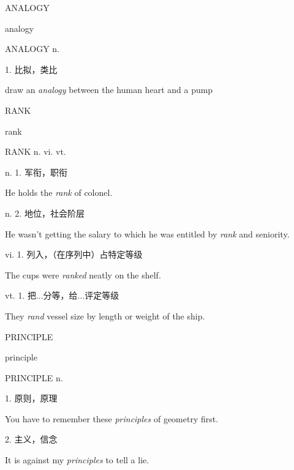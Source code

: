 \begin{flashcard}{
ANALOGY

analogy
}
\begin{center}
ANALOGY n. 
\end{center}
1. 比拟，类比

draw an \textit{analogy} between the human heart and a pump

\end{flashcard}
\begin{flashcard}{
RANK

rank
}
\begin{center}
RANK n. vi. vt. \textipa{[r\ae \ng k]}
\end{center}
n. 1. 军衔，职衔

He holds the \textit{rank} of colonel.

n. 2. 地位，社会阶层

He wasn't getting the salary to which he was entitled by \textit{rank} and seniority.

vi. 1. 列入，（在序列中）占特定等级

The cups were \textit{ranked} neatly on the shelf.

vt. 1. 把...分等，给...评定等级

They \textit{rand} vessel size by length or weight of the ship.

\end{flashcard}
\begin{flashcard}{
PRINCIPLE

principle
}
\begin{center}
PRINCIPLE n. 
\end{center}
1. 原则，原理

You have to remember these \textit{principles} of geometry first.

2. 主义，信念

It is against my \textit{principles} to tell a lie.

\end{flashcard}
